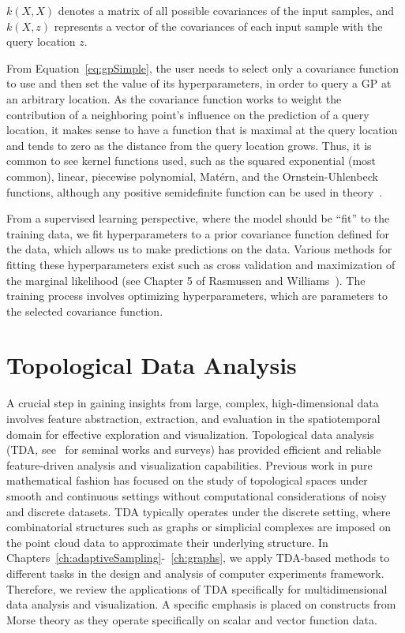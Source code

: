 $k(X,X)$ denotes a matrix of all possible covariances of the input samples, and $k(X,z)$ represents a vector of the covariances of each input sample with the query location $z$.

From Equation~\ref{eq:gpSimple}, the user needs to select only a covariance function to use and then set the value of its hyperparameters, in order to query a GP at an arbitrary location.
%
As the covariance function works to weight the contribution of a neighboring point's influence on the prediction of a query location, it makes sense to have a function that is maximal at the query location and tends to zero as the distance from the query location grows.
%
Thus, it is common to see kernel functions used, such as the squared exponential (most common), linear, piecewise polynomial, Mat\'{e}rn, and the Ornstein-Uhlenbeck functions, although any positive semidefinite function can be used in theory~\cite{RasmussenWilliams2006}.

From a supervised learning perspective, where the model should be ``fit'' to the training data, we fit hyperparameters to a prior covariance function defined for the data, which allows us to make predictions on the data.
%
Various methods for fitting these hyperparameters exist such as cross validation and maximization of the marginal likelihood (see Chapter 5 of Rasmussen and Williams~\cite{RasmussenWilliams2006}).
%
The training process involves optimizing hyperparameters, which are parameters to the selected covariance function.

\section{Topological Data Analysis}
A crucial step in gaining insights from large, complex, high-dimensional data involves feature abstraction, extraction, and evaluation in the spatiotemporal domain for effective exploration and visualization.
%
Topological data analysis (TDA, see~\cite{EdsbrunnerHarer2010,Zomorodian2005,BiasottisDeFlorianiFalcidieno2008,Carlsson2009,EdelsbrunnerHarer2008,Ghrist2009} for seminal works and surveys) has provided efficient and reliable feature-driven analysis and visualization capabilities.
%
Previous work in pure mathematical fashion has focused on the study of topological spaces under smooth and continuous settings without computational considerations of noisy and discrete datasets.
%
TDA typically operates under the discrete setting, where combinatorial structures such as graphs or simplicial complexes are imposed on the point cloud data to approximate their underlying structure.
%
In Chapters~\ref{ch:adaptiveSampling}-~\ref{ch:graphs}, we apply TDA-based methods to different tasks in the design and analysis of computer experiments framework.
%
Therefore, we review the applications of TDA specifically for multidimensional data analysis and visualization.
%
A specific emphasis is placed on constructs from Morse theory as they operate specifically on scalar and vector function data.


